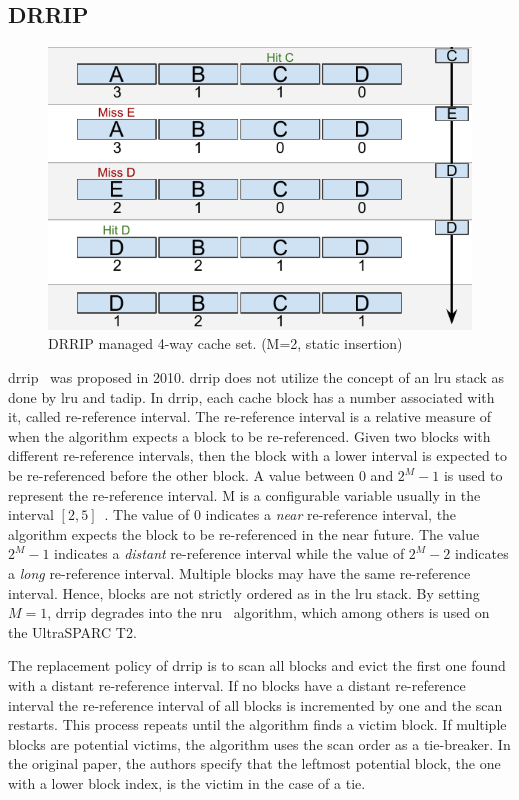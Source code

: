 \subsection{DRRIP}
\label{sec:algorithms:drrip}

\begin{figure}[t]
    \centering
    \includegraphics[width=.65\textwidth]{figures/algorithms/DRRIP}
    \caption[DRRIP managed 4-way cache set.]{DRRIP managed 4-way cache set. (M=2, static insertion)}
    \label{fig:algorithms:drrip_example}
\end{figure}

\gls{drrip}~\cite{Jaleel2010} was proposed in 2010.
\gls{drrip} does not utilize the concept of an \gls{lru} stack as done by \gls{lru} and \gls{tadip}.
In \gls{drrip}, each cache block has a number associated with it, called re-reference interval.
The re-reference interval is a relative measure of when the algorithm expects a block to be re-referenced.
Given two blocks with different re-reference intervals, then the block with a lower interval is expected to be re-referenced before the other block.
A value between 0 and $2^M - 1$ is used to represent the re-reference interval.
M is a configurable variable usually in the interval $[2, 5]$~\cite{Jaleel2010}.
The value of 0 indicates a \textit{near} re-reference interval, the algorithm expects the block to be re-referenced in the near future.
The value $2^M - 1$ indicates a \textit{distant} re-reference interval while the value of $2^M - 2$ indicates a \textit{long} re-reference interval.
Multiple blocks may have the same re-reference interval. 
Hence, blocks are not strictly ordered as in the \gls{lru} stack.
By setting $M=1$, \gls{drrip} degrades into the \gls{nru}~\cite{Microsystems2007} algorithm, which among others is used on the UltraSPARC T2.

The replacement policy of \gls{drrip} is to scan all blocks and evict the first one found with a distant re-reference interval.
If no blocks have a distant re-reference interval the re-reference interval of all blocks is incremented by one and the scan restarts.
This process repeats until the algorithm finds a victim block.
If multiple blocks are potential victims, the algorithm uses the scan order as a tie-breaker.
In the original paper, the authors specify that the leftmost potential block, the one with a lower block index, is the victim in the case of a tie.

